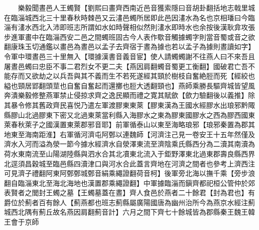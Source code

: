 　　樂毅聞晝邑人王蠋賢【劉熙曰畫齊西南近邑音獲索隱曰音胡卦翻括地志戟里城在臨淄城西北三十里春秋時棘邑又云澅邑蠋所居即此邑因澅水為名也京相璠曰今臨淄有澅水西北入沛即班志所謂如水如時聲相似然則澅水即時水也余按後漢耿弇攻張步進軍畫中在臨淄西安二邑之間蠋班固古今人表作歜音觸據蠋字則當音蜀或音之欲翻康珠玉切通鑑以畫邑為晝邑以孟子去齊宿于晝為據也若以孟子為據則晝讀如字】令軍中環晝邑三十里無入【環據漢書音義音宦】使人請蠋蠋謝不往燕人曰不來吾且屠晝邑蠋曰忠臣不事二君烈女不更二夫【燕因肩翻蠋音蜀更工衡翻】國破君亡吾不能存而又欲劫之以兵吾與其不義而生不若死遂經其頸於樹枝自奮絶脰而死【經絞也縊也頸居郢翻頭莖也自奮自奮起而還擲也脰大透翻頸也】燕師乘勝長驅齊城皆望風奔潰樂毅修整燕軍禁止侵掠求齊之逸民顯而禮之寛其賦歛【歛力驗翻後以義推】除其暴令修其舊政齊民喜悦乃遣左軍渡膠東東萊【膠東漢為王國水經膠水出琅邪黔陬縣膠山北過膠東下密又北過東萊當利縣入海膠水之東為膠東國膠水之西為膠西國東萊春秋萊子之國漢置東萊郡邪音耶】前軍循泰山以東至海略琅邪【琅邪秦置為郡其地東至海南距淮】右軍循河濟屯阿鄄以連魏師【河濟注己見一卷安王十五年然僅及濟水入河而溢為滎一節今據水經濟水自滎澤東流至濟陰乘氏縣西分為二瀆其南瀆為荷水東南流至山陽湖陸縣與泗水合其北凟東北流入于鉅野澤東北過東郡壽良縣西界北逕須昌穀城至臨邑縣四瀆津口與河水合此蓋言齊地在河濟之間者也參考上濟西注可見濟子禮翻阿東阿鄄鄄城鄄音絹乘繩證翻荷音柯】後軍旁北海以撫千乘【旁步浪翻自臨淄東北至海北海地也漢置郡乘繩證翻】中軍據臨淄而鎭齊都祀桓公管仲於郊表賢者之閭封王蠋之墓【王蠋墓蓋在晝】齊人食邑於燕者二十餘君【封為君也】有爵位於薊者百有餘人【薊燕都也班志薊縣屬廣陽國唐為幽州治所今為燕京水經注薊城西北隅有薊丘故名燕因肩翻薊音計】六月之間下齊七十餘城皆為郡縣秦王魏王韓王會于京師


